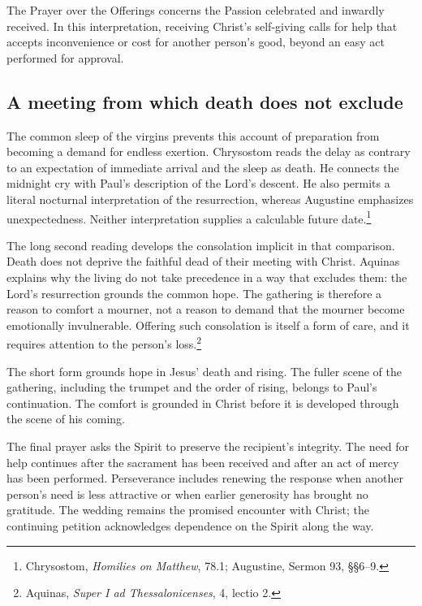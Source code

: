 The Prayer over the Offerings concerns the Passion celebrated and inwardly received. In this interpretation, receiving Christ's self-giving calls for help that accepts inconvenience or cost for another person's good, beyond an easy act performed for approval.

\subsection{A meeting from which death does not exclude}
The common sleep of the virgins prevents this account of preparation from becoming a demand for endless exertion. Chrysostom reads the delay as contrary to an expectation of immediate arrival and the sleep as death. He connects the midnight cry with Paul's description of the Lord's descent. He also permits a literal nocturnal interpretation of the resurrection, whereas Augustine emphasizes unexpectedness. Neither interpretation supplies a calculable future date.\footnote{Chrysostom, \textit{Homilies on Matthew}, 78.1; Augustine, Sermon 93, §§6--9.}

The long second reading develops the consolation implicit in that comparison. Death does not deprive the faithful dead of their meeting with Christ. Aquinas explains why the living do not take precedence in a way that excludes them: the Lord's resurrection grounds the common hope. The gathering is therefore a reason to comfort a mourner, not a reason to demand that the mourner become emotionally invulnerable. Offering such consolation is itself a form of care, and it requires attention to the person's loss.\footnote{Aquinas, \textit{Super I ad Thessalonicenses}, 4, lectio 2.}

The short form grounds hope in Jesus' death and rising. The fuller scene of the gathering, including the trumpet and the order of rising, belongs to Paul's continuation. The comfort is grounded in Christ before it is developed through the scene of his coming.

The final prayer asks the Spirit to preserve the recipient's integrity. The need for help continues after the sacrament has been received and after an act of mercy has been performed. Perseverance includes renewing the response when another person's need is less attractive or when earlier generosity has brought no gratitude. The wedding remains the promised encounter with Christ; the continuing petition acknowledges dependence on the Spirit along the way.

